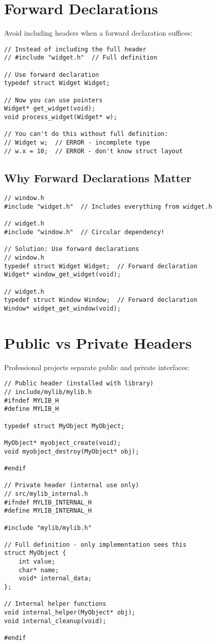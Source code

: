 \section{Forward Declarations}

Avoid including headers when a forward declaration suffices:

\begin{lstlisting}
// Instead of including the full header
// #include "widget.h"  // Full definition

// Use forward declaration
typedef struct Widget Widget;

// Now you can use pointers
Widget* get_widget(void);
void process_widget(Widget* w);

// You can't do this without full definition:
// Widget w;  // ERROR - incomplete type
// w.x = 10;  // ERROR - don't know struct layout
\end{lstlisting}

\subsection{Why Forward Declarations Matter}

\begin{lstlisting}
// window.h
#include "widget.h"  // Includes everything from widget.h

// widget.h
#include "window.h"  // Circular dependency!

// Solution: Use forward declarations
// window.h
typedef struct Widget Widget;  // Forward declaration
Widget* window_get_widget(void);

// widget.h
typedef struct Window Window;  // Forward declaration
Window* widget_get_window(void);
\end{lstlisting}

\section{Public vs Private Headers}

Professional projects separate public and private interfaces:

\begin{lstlisting}
// Public header (installed with library)
// include/mylib/mylib.h
#ifndef MYLIB_H
#define MYLIB_H

typedef struct MyObject MyObject;

MyObject* myobject_create(void);
void myobject_destroy(MyObject* obj);

#endif

// Private header (internal use only)
// src/mylib_internal.h
#ifndef MYLIB_INTERNAL_H
#define MYLIB_INTERNAL_H

#include "mylib/mylib.h"

// Full definition - only implementation sees this
struct MyObject {
    int value;
    char* name;
    void* internal_data;
};

// Internal helper functions
void internal_helper(MyObject* obj);
void internal_cleanup(void);

#endif
\end{lstlisting}

